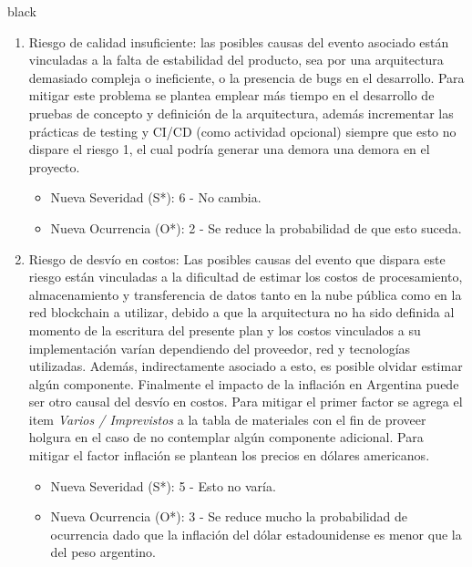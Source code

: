 \documentclass[
11pt, %
]{charter}
\begin{document}
\begin{consigna}{black}
\begin{enumerate}
	
	\item Riesgo de calidad insuficiente: las posibles causas del evento asociado están vinculadas a la falta de estabilidad del producto, sea por una arquitectura demasiado compleja o ineficiente, o la presencia de bugs en el desarrollo. Para mitigar este problema se plantea emplear más tiempo en el desarrollo de pruebas de concepto y definición de la arquitectura, además incrementar las prácticas de testing y CI/CD (como actividad opcional) siempre que esto no dispare el riesgo 1, el cual podría generar una demora una demora en el proyecto.
	\begin{itemize}
		\item Nueva Severidad (S*): 6 - No cambia.
		\item Nueva Ocurrencia (O*): 2 - Se reduce la probabilidad de que esto suceda.
	\end{itemize}	
	
	\item Riesgo de desvío en costos: Las posibles causas del evento que dispara este riesgo están vinculadas a la dificultad de estimar los costos de procesamiento, almacenamiento y transferencia de datos tanto en la nube pública como en la red blockchain a utilizar, debido a que la arquitectura no ha sido definida al momento de la escritura del presente plan y los costos vinculados a su implementación varían dependiendo del proveedor, red y tecnologías utilizadas. Además, indirectamente asociado a esto, es posible olvidar estimar algún componente. Finalmente el impacto de la inflación en Argentina puede ser otro causal del desvío en costos. Para mitigar el primer factor se agrega el item \textit{Varios / Imprevistos} a la tabla de materiales con el fin de proveer holgura en el caso de no contemplar algún componente adicional. Para mitigar el factor inflación se plantean los precios en dólares americanos.
	\begin{itemize}
		\item Nueva Severidad (S*): 5 - Esto no varía.
		\item Nueva Ocurrencia (O*): 3 - Se reduce mucho la probabilidad de ocurrencia dado que la inflación del dólar estadounidense es menor que la del peso argentino.
	\end{itemize}
\end{enumerate}


\end{consigna}
\end{document}
